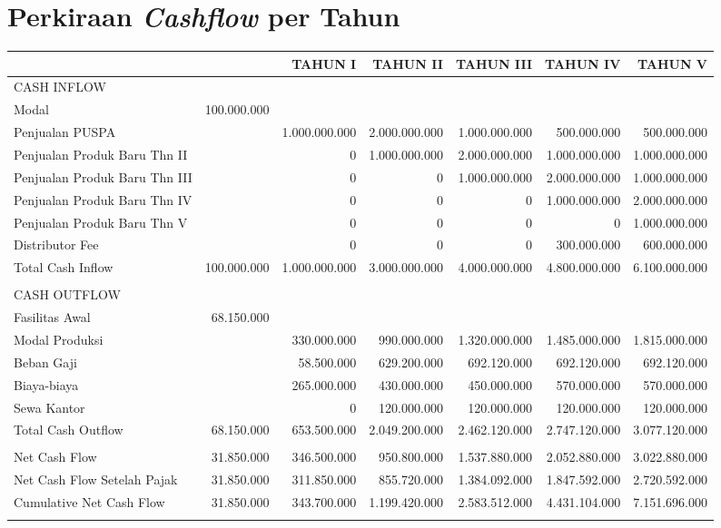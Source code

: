 \section{Perkiraan \textit{Cashflow} per Tahun}
\begin{tabular}{|>{\scriptsize}p{2.5cm}|>{\scriptsize}r|>{\scriptsize}r|>{\scriptsize}r|>{\scriptsize}r|>{\scriptsize}r|>{\scriptsize}r|}
\hline
 & & TAHUN I & TAHUN II & TAHUN III & TAHUN IV & TAHUN V\\
\hline
CASH INFLOW & & & & & & \\
\hline
Modal & 100.000.000 & & & & & \\
\hline
Penjualan PUSPA & & 1.000.000.000 & 2.000.000.000 & 1.000.000.000 & 500.000.000 & 500.000.000\\
\hline
Penjualan Produk Baru Thn II & & 0 & 1.000.000.000 & 2.000.000.000 & 1.000.000.000 & 1.000.000.000\\
\hline
Penjualan Produk Baru Thn III & & 0 & 0 & 1.000.000.000 & 2.000.000.000 & 1.000.000.000\\
\hline
Penjualan Produk Baru Thn IV & & 0 & 0 & 0 & 1.000.000.000 & 2.000.000.000\\
\hline
Penjualan Produk Baru Thn V & & 0 & 0 & 0 & 0 & 1.000.000.000\\
\hline
Distributor Fee & & 0 & 0 & 0 & 300.000.000 & 600.000.000\\
\hline
Total Cash Inflow & 100.000.000 & 1.000.000.000 & 3.000.000.000 & 4.000.000.000 & 4.800.000.000 & 6.100.000.000\\
\hline
 & & & & & & \\
\hline
CASH OUTFLOW & & & & & & \\
\hline
Fasilitas Awal & 68.150.000 & & & & & \\
\hline
Modal Produksi & & 330.000.000 & 990.000.000 & 1.320.000.000 & 1.485.000.000 & 1.815.000.000\\
\hline
Beban Gaji & & 58.500.000 & 629.200.000 & 692.120.000 & 692.120.000 & 692.120.000\\
\hline
Biaya-biaya & & 265.000.000 & 430.000.000 & 450.000.000 & 570.000.000 & 570.000.000\\
\hline
Sewa Kantor & & 0 & 120.000.000 & 120.000.000 & 120.000.000 & 120.000.000\\
\hline
Total Cash Outflow & 68.150.000 & 653.500.000 &2.049.200.000 & 2.462.120.000 & 2.747.120.000 & 3.077.120.000\\
\hline
 & & & & & & \\
\hline
Net Cash Flow & 31.850.000 & 346.500.000 & 950.800.000 & 1.537.880.000 & 2.052.880.000 & 3.022.880.000\\
\hline
Net Cash Flow Setelah Pajak & 31.850.000 & 311.850.000 & 855.720.000 & 1.384.092.000 & 1.847.592.000 & 2.720.592.000\\
\hline
Cumulative Net Cash Flow & 31.850.000 & 343.700.000 & 1.199.420.000 & 2.583.512.000 & 4.431.104.000 & 7.151.696.000\\
\hline
 & & & & & & \\
\hline
\end{tabular}

